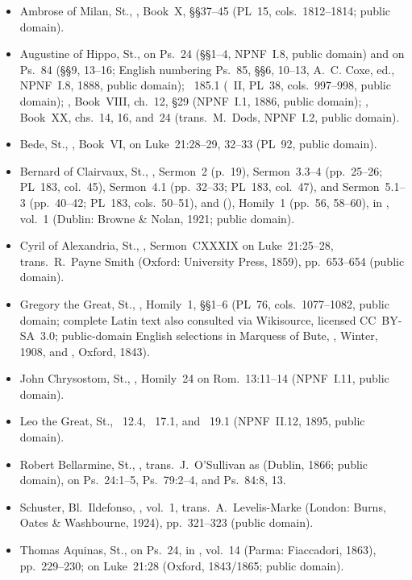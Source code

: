 \begin{itemize}
\item Ambrose of Milan, St., , Book~X, \S\S37--45 (PL~15, cols.~1812--1814; public domain).
\item Augustine of Hippo, St.,  on Ps.~24 (\S\S1--4, NPNF~I.8, public domain) and on Ps.~84 (\S\S9, 13--16; English numbering Ps.~85, \S\S6, 10--13, A.~C. Coxe, ed., NPNF~I.8, 1888, public domain); ~185.1 (~II, PL~38, cols.~997--998, public domain); , Book~VIII, ch.~12, \S29 (NPNF~I.1, 1886, public domain); , Book~XX, chs.~14, 16, and~24 (trans.\ M.~Dods, NPNF~I.2, public domain).
\item Bede, St., , Book~VI, on Luke~21:28--29, 32--33 (PL~92, public domain).
\item Bernard of Clairvaux, St., , Sermon~2 (p.~19), Sermon~3.3--4 (pp.~25--26; PL~183, col.~45), Sermon~4.1 (pp.~32--33; PL~183, col.~47), and Sermon~5.1--3 (pp.~40--42; PL~183, cols.~50--51), and  (), Homily~1 (pp.~56, 58--60), in , vol.~1 (Dublin: Browne \& Nolan, 1921; public domain).
\item Cyril of Alexandria, St., , Sermon~CXXXIX on Luke~21:25--28, trans.\ R.~Payne Smith (Oxford: University Press, 1859), pp.~653--654 (public domain).
\item Gregory the Great, St., , Homily~1, \S\S1--6 (PL~76, cols.~1077--1082, public domain; complete Latin text also consulted via Wikisource, licensed CC~BY-SA~3.0; public-domain English selections in Marquess of Bute, , Winter, 1908, and , Oxford, 1843).
\item John Chrysostom, St., , Homily~24 on Rom.~13:11--14 (NPNF~I.11, public domain).
\item Leo the Great, St., ~12.4, ~17.1, and ~19.1 (NPNF~II.12, 1895, public domain).
\item Robert Bellarmine, St., , trans.\ J.~O'Sullivan as  (Dublin, 1866; public domain), on Ps.~24:1--5, Ps.~79:2--4, and Ps.~84:8, 13.
\item Schuster, Bl.~Ildefonso, , vol.~1, trans.\ A.~Levelis-Marke (London: Burns, Oates \& Washbourne, 1924), pp.~321--323 (public domain).
\item Thomas Aquinas, St.,  on Ps.~24, in , vol.~14 (Parma: Fiaccadori, 1863), pp.~229--230;  on Luke~21:28 (Oxford, 1843/1865; public domain).
\end{itemize}

